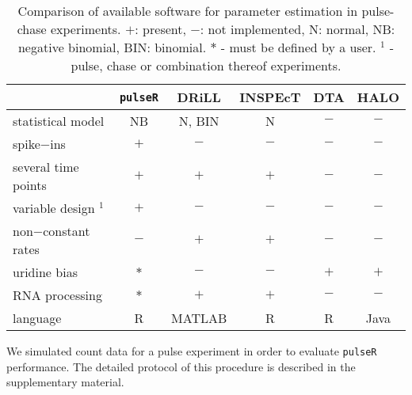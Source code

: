 \begin{table}[tbh]
 \vspace*{-.4cm}
 \begin{tabular}{|l|c|c|c|c|c|}\hline
                        &\verb|pulseR| &DRiLL          &INSPEcT&DTA    &HALO       \\\hline
 statistical model      & NB           &N, BIN         &N       & $-$  & $-$      \\\hline                         
 spike$-$ins            & $+$          &   $-$         &  $-$   &  $-$ & $-$         \\\hline               
 several time points    & $+$          &   $+$         &  $+$   &  $-$ & $-$         \\\hline                    
  variable design $^1$  & $+$          &   $-$         &  $-$   &  $-$ & $-$         \\\hline 
 non$-$constant rates   & $-$          &   $+$         &  $+$   &  $-$ & $-$         \\\hline 
      uridine bias      & $\ast$       &   $-$         &  $-$   &  $+$ & $+$         \\\hline 
       RNA processing   &$\ast$        &   $+$         &  $+$   &  $-$ & $-$         \\\hline 
  language              & R            &MATLAB         &  R     &  R   & Java      \\\hline 
 \end{tabular}
 \vspace*{.1cm}
\caption{
Comparison of available software for parameter estimation in 
pulse-chase experiments. 
$+$: present, $-$: not implemented,
N: normal, NB: negative binomial, BIN: binomial.
$\ast$ - must be defined by a user. $^1$ - pulse, chase or combination thereof experiments.
 \vspace*{-.7cm}
}
\end{table}
We simulated count data for a pulse experiment 
in order to evaluate \verb|pulseR| performance.
The  detailed protocol of this procedure is described in the supplementary material.

